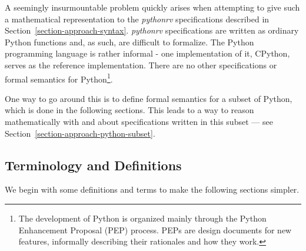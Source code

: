 \documentclass[a4paper,11pt]{kth-mag}
\begin{document}
A seemingly insurmountable problem quickly arises when attempting to give such
a mathematical representation to the \textit{pythonrv} specifications described
in Section~\ref{section-approach-syntax}. \textit{pythonrv} specifications are
written as ordinary Python functions and, as such, are difficult to formalize.
The Python programming language is rather informal - one implementation of it,
CPython, serves as the reference implementation. There are no other
specifications or formal semantics for Python\footnote{The development of
  Python is organized mainly through the Python Enhancement Proposal (PEP)
  process. PEPs are design documents for new features, informally describing
their rationales and how they work.}.

One way to go around this is to define formal semantics for a subset of Python,
which is done in the following sections. This leads to a way to reason
mathematically with and about specifications written in this subset --- see
Section~\ref{section-approach-python-subset}.


\subsection{Terminology and Definitions}

We begin with some definitions and terms to make the following sections
simpler.
\end{document}
